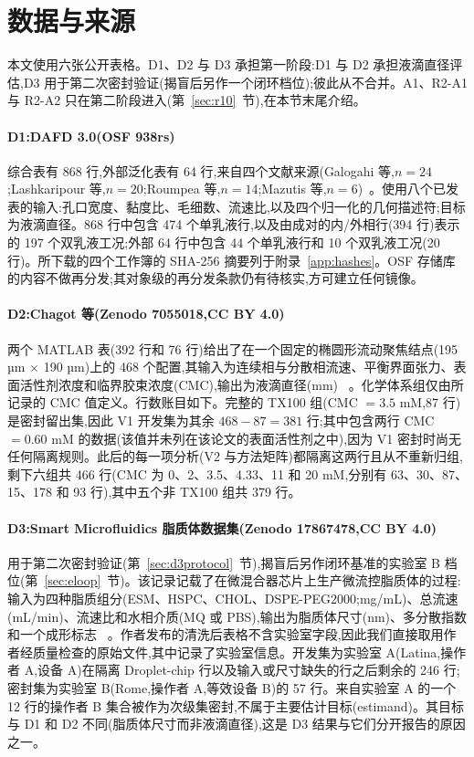 \documentclass[11pt,a4paper]{ctexart}
\begin{document}
\section{数据与来源}
\label{sec:data}

本文使用六张公开表格。D1、D2 与 D3 承担第一阶段:D1 与 D2 承担液滴直径评估,D3 用于第二次密封验证(揭盲后另作一个闭环档位);彼此从不合并。A1、R2-A1 与 R2-A2 只在第二阶段进入(第~\ref{sec:r10}~节),在本节末尾介绍。

\paragraph{D1:DAFD 3.0(OSF 938rs)} 综合表有 868 行,外部泛化表有 64 行,来自四个文献来源(Galogahi 等,$n=24$;Lashkaripour 等,$n=20$;Roumpea 等,$n=14$;Mazutis 等,$n=6$)~\cite{lashkaripour2024}。使用八个已发表的输入:孔口宽度、黏度比、毛细数、流速比,以及四个归一化的几何描述符;目标为液滴直径。868 行中包含 474 个单乳液行,以及由成对的内/外相行(394 行)表示的 197 个双乳液工况;外部 64 行中包含 44 个单乳液行和 10 个双乳液工况(20 行)。所下载的四个工作簿的 SHA-256 摘要列于附录~\ref{app:hashes}。OSF 存储库的内容不做再分发;其对象级的再分发条款仍有待核实,方可建立任何镜像。

\paragraph{D2:Chagot 等(Zenodo 7055018,CC BY 4.0)} 两个 MATLAB 表(392 行和 76 行)给出了在一个固定的椭圆形流动聚焦结点(195 µm $\times$ 190 µm)上的 468 个配置,其输入为连续相与分散相流速、平衡界面张力、表面活性剂浓度和临界胶束浓度(CMC),输出为液滴直径(mm) ~\cite{chagot2022}。化学体系组仅由所记录的 CMC 值定义。行数账目如下。完整的 TX100 组(CMC $=3.5$ mM,87 行)是密封留出集,因此 V1 开发集为其余 $468-87=381$ 行;其中包含两行 CMC $=0.60$ mM 的数据(该值并未列在该论文的表面活性剂之中),因为 V1 密封时尚无任何隔离规则。此后的每一项分析(V2 与方法矩阵)都隔离这两行且从不重新归组,剩下六组共 466 行(CMC 为 0、2、3.5、4.33、11 和 20 mM,分别有 63、30、87、15、178 和 93 行),其中五个非 TX100 组共 379 行。

\paragraph{D3:Smart Microfluidics 脂质体数据集(Zenodo 17867478,CC BY 4.0)} 用于第二次密封验证(第~\ref{sec:d3protocol}~节),揭盲后另作闭环基准的实验室 B 档位(第~\ref{sec:eloop}~节)。该记录记载了在微混合器芯片上生产微流控脂质体的过程:输入为四种脂质组分(ESM、HSPC、CHOL、DSPE-PEG2000;mg/mL)、总流速(mL/min)、流速比和水相介质(MQ 或 PBS),输出为脂质体尺寸(nm)、多分散指数和一个成形标志 ~\cite{smartmicrofluidics2026}。作者发布的清洗后表格不含实验室字段,因此我们直接取用作者经质量检查的原始文件,其中记录了实验室信息。开发集为实验室 A(Latina,操作者 A,设备 A)在隔离 Droplet-chip 行以及输入或尺寸缺失的行之后剩余的 246 行;密封集为实验室 B(Rome,操作者 A,等效设备 B)的 57 行。来自实验室 A 的一个 12 行的操作者 B 集合被作为次级集密封,不属于主要估计目标(estimand)。其目标与 D1 和 D2 不同(脂质体尺寸而非液滴直径),这是 D3 结果与它们分开报告的原因之一。
\end{document}
